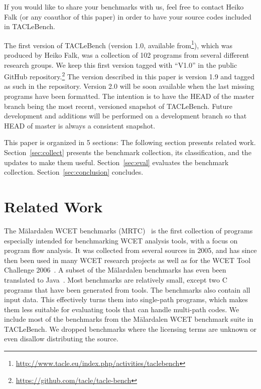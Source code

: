 \documentclass[a4paper,UKenglish]{oasics-v2016}
\begin{document}
If you would like to share your  benchmarks with us,
feel free to contact Heiko Falk (or any coauthor of this paper) in order
to have your source codes included in TACLeBench.

The first version of TACLeBench (version 1.0, available
from\footnote{\url{http://www.tacle.eu/index.php/activities/taclebench}}), which was produced
by Heiko Falk, was a collection of 102 programs from several different
research groups. We keep this first version tagged with ``V1.0'' in the public
GitHub repository.\footnote{\url{https://github.com/tacle/tacle-bench}}
The version described in this paper is version 1.9 and tagged as such in the
repository. Version 2.0 will be soon available when the last missing programs have been formatted.
The intention is to have the HEAD of the master branch being
the most recent, versioned snapshot of TACLeBench.
Future development and additions will be performed on a development
branch so that HEAD of master is always a consistent snapshot.

This paper is organized in 5 sections: The following section presents related work.
Section~\ref{sec:collect} presents the benchmark collection, its classification, and the updates
to make them useful.
Section~\ref{sec:eval} evaluates the benchmark collection.
Section~\ref{sec:conclusion} concludes.

\section{Related Work}
\label{sec:related}

The M{\"a}lardalen WCET benchmarks (MRTC)~\cite{wcet:bench:2012} is the first collection of programs especially
intended for benchmarking WCET analysis tools, with a focus on program flow analysis.
It was collected from several sources in 2005, and has since then been
used in many WCET research projects as well as for the WCET Tool Challenge 2006~\cite{Gustafsson:ISOLA2006}.
A subset of the M{\"a}lardalen benchmarks has even been translated to
Java~\cite{jop:volta:rtas2008}. Most benchmarks are relatively small, except
two C programs that have been generated from tools.
The benchmarks also contain all input data. This effectively turns them into single-path programs, which
makes them less suitable for evaluating tools that can handle multi-path codes.
We include most of the benchmarks from the
M{\"a}lardalen WCET benchmark suite in TACLeBench.
We dropped benchmarks where the licensing terms are unknown
or even disallow distributing the source.
\end{document}
